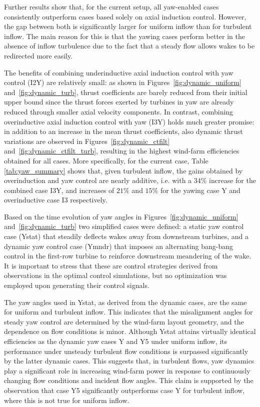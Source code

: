 \documentclass[energies,article,submit,moreauthors,latex,10pt,a4paper]{mdpi}
\begin{document}
Further results show that, for the current setup, all yaw-enabled cases consistently outperform cases based solely on axial induction control. However, the gap between both is significantly larger for uniform inflow than for turbulent inflow. The main reason for this is that the yawing cases perform better in the absence of inflow turbulence due to the fact that a steady flow allows wakes to be redirected more easily. 

The benefits of combining underinductive axial induction control with yaw control (I2Y) are relatively small: as shown in Figures~\ref{fig:dynamic_uniform} and~\ref{fig:dynamic_turb}, thrust coefficients are barely reduced from their initial upper bound since the thrust forces exerted by turbines in yaw are already reduced through smaller axial velocity components. In contrast, combining overinductive axial induction control with yaw (I3Y) holds much greater promise: in addition to an increase in the mean thrust coefficients, also dynamic thrust variations are observed in Figures~\ref{fig:dynamic_ctfilt} and~\ref{fig:dynamic_ctfilt_turb}, resulting in the highest wind-farm efficiencies obtained for all cases. More specifically, for the current case, Table \ref{tab:yaw_summary} shows that, given turbulent inflow, the gains obtained by overinduction and yaw control are nearly additive, i.e. with a $34\%$ increase for the combined case I3Y, and increases of $21\%$ and $15\%$ for the yawing case Y and overinductive case I3 respectively.

Based on the time evolution of yaw angles in Figures~\ref{fig:dynamic_uniform} and~\ref{fig:dynamic_turb} two simplified cases were defined: a static yaw control case (Ystat) that steadily deflects wakes away from downstream turbines, and a dynamic yaw control case (Ymndr) that imposes an alternating bang-bang control in the first-row turbine to reinforce downstream meandering of the wake. It is important to stress that these are control strategies derived from observations in the optimal control simulations, but no optimization was employed upon generating their control signals. 

The yaw angles used in Ystat, as derived from the dynamic cases, are the same for uniform and turbulent inflow. This indicates that the misalignment angles for steady yaw control are determined by the wind-farm layout geometry, and the dependence on flow conditions is minor. Although Ystat attains virtually identical efficiencies as the dynamic yaw cases Y and Y5 under uniform inflow, its performance under unsteady turbulent flow conditions is surpassed significantly by the latter dynamic cases. This suggests that, in turbulent flows, yaw dynamics play a significant role in increasing wind-farm power in response to continuously changing flow conditions and incident flow angles. This claim is supported by the observation that case Y5 significantly outperforms case Y for turbulent inflow, where this is not true for uniform inflow. 
\end{document}
